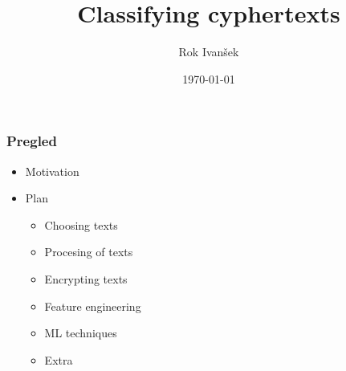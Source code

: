 \documentclass{beamer}
\title[Classifying cyphertexts]{Classifying cyphertexts} %
\author{Rok Ivanšek} %
\institute[FMF, FRI] %
{
Univerza v Ljubljani \\ %
\medskip
}
\date{\today} %
\begin{document}
\begin{frame}
\titlepage %
\end{frame}

\begin{frame}
\frametitle{Pregled} %
\begin{itemize}
	\item Motivation
	\item Plan
	\begin{itemize}
		\item Choosing texts
		\item Procesing of texts
		\item Encrypting texts
		\item Feature engineering
		\item ML techniques
		\item Extra
	\end{itemize}
\end{itemize}
\end{frame}
%
%
%
%
%
\end{document}
